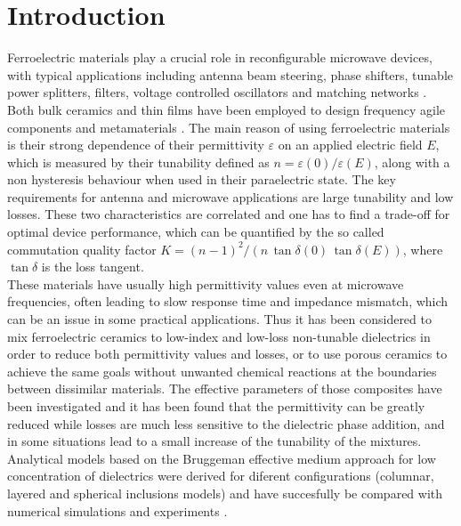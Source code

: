 \documentclass[%
 aip,
 amsmath,amssymb,
 reprint,%
linenumbers
]{revtex4-1}
\begin{document}
 \section{Introduction}
 Ferroelectric materials play a crucial role in reconfigurable
 microwave devices, with typical applications including antenna beam steering,
 phase shifters, tunable power splitters, filters, voltage controlled oscillators and
 matching networks \cite{tagantsev_ferroelectric_2018}. Both bulk ceramics and thin films have
 been employed to design frequency agile components \cite{vendik_ferroelectric_1999,
 lancaster_thin-film_1998,xi_oxide_2000} and metamaterials \cite{hand_frequency_2008, zhao_experimental_2008}.
 The main reason of using
 ferroelectric materials is their strong dependence of their permittivity $\varepsilon$
 on an applied electric field $E$, which is measured by their tunability defined as $n = \varepsilon(0)/\varepsilon(E)$,
 along with a non hysteresis behaviour when used in their paraelectric state.
 The key requirements for antenna and microwave applications are large tunability and low losses.
 These two characteristics are correlated and one has to find a trade-off for optimal
  device performance, which can be quantified by the so called commutation quality factor
 $K = (n -1)^2/(n\, \tan\delta(0)\,\tan\delta(E))$, where $\tan\delta$ is the loss tangent.\\
 These materials have usually high permittivity values even at microwave frequencies,
 often leading to slow response time and impedance mismatch, which can be an issue in some practical
 applications. Thus it has been considered to mix ferroelectric ceramics to low-index and
 low-loss non-tunable dielectrics in order to reduce both permittivity values and losses, or to
 use porous ceramics to achieve the same goals without unwanted chemical reactions at the boundaries between dissimilar materials. 
The effective parameters of those composites have been investigated
\cite{sherman_ferroelectric-dielectric_2006, jylha_tunability_2008, sherman_tunability_2004, astafiev_can_2003}
and it has been found that the permittivity can be greatly reduced while losses are much less
 sensitive to the dielectric phase addition, and in some situations lead to a small
  increase of the tunability of the mixtures. Analytical models based on the Bruggeman effective
medium approach for low concentration of dielectrics were derived for diferent configurations (columnar, layered and spherical
inclusions models) and have succesfully be compared with numerical simulations and experiments \cite{sherman_ferroelectric-dielectric_2006}.
\end{document}
